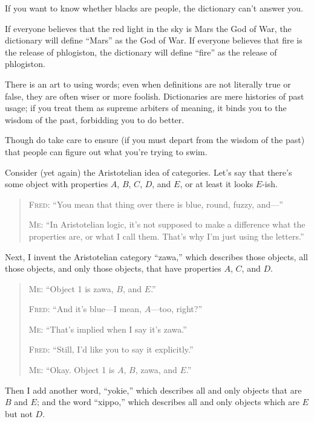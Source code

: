 {
 If you want to know whether blacks are people, the dictionary
can't answer you.}

{
 If everyone believes that the red light in the sky is Mars the God
of War, the dictionary will define
``Mars'' as the God of War. If
everyone believes that fire is the release of phlogiston, the
dictionary will define ``fire'' as
the release of phlogiston.}

{
 There is an art to using words; even when definitions are not
literally true or false, they are often wiser or more foolish.
Dictionaries are mere histories of past usage; if you treat them as
supreme arbiters of meaning, it binds you to the wisdom of the past,
forbidding you to do better.}

{
 Though do take care to ensure (if you must depart from the wisdom
of the past) that people can figure out what you're
trying to swim.}

\myendsectiontext


{
 Consider (yet again) the Aristotelian idea of categories.
Let's say that there's some object with
properties $A$, $B$, $C$, $D$, and $E$, or at least it looks $E$-ish.}

\begin{quotation}
{
 \textsc{Fred}: ``You mean that thing over there is blue,
round, fuzzy, and---''}

{
 \textsc{Me}: ``In Aristotelian logic, it's
not supposed to make a difference what the properties are, or what I
call them. That's why I'm just using
the letters.''}
\end{quotation}

{
 Next, I invent the Aristotelian category
``zawa,'' which describes those
objects, all those objects, and only those objects, that have
properties $A$, $C$, and $D$.}

\begin{quotation}
{
 \textsc{Me}: ``Object 1 is zawa, $B$, and
$E$.''}

{
 \textsc{Fred}: ``And it's blue---I mean,
$A$---too, right?''}

{
 \textsc{Me}: ``That's implied when I say
it's zawa.''}

{
 \textsc{Fred}: ``Still, I'd like you to
say it explicitly.''}

{
 \textsc{Me}: ``Okay. Object 1 is $A$, $B$, zawa, and
$E$.''}
\end{quotation}

{
 Then I add another word,
``yokie,'' which describes all and
only objects that are $B$ and $E$; and the word
``xippo,'' which describes all and
only objects which are $E$ but not $D$.}

